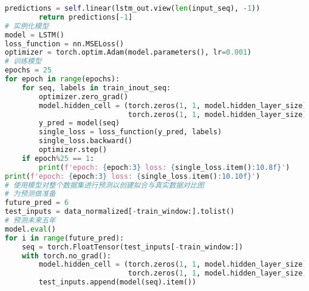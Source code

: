 \begin{lstlisting}[language=python,caption={就业前景}]
        predictions = self.linear(lstm_out.view(len(input_seq), -1))
        return predictions[-1]
# 实例化模型
model = LSTM()
loss_function = nn.MSELoss()
optimizer = torch.optim.Adam(model.parameters(), lr=0.001)
# 训练模型
epochs = 25
for epoch in range(epochs):
    for seq, labels in train_inout_seq:
        optimizer.zero_grad()
        model.hidden_cell = (torch.zeros(1, 1, model.hidden_layer_size),
                             torch.zeros(1, 1, model.hidden_layer_size))
        y_pred = model(seq)
        single_loss = loss_function(y_pred, labels)
        single_loss.backward()
        optimizer.step()
    if epoch%25 == 1:
        print(f'epoch: {epoch:3} loss: {single_loss.item():10.8f}')
print(f'epoch: {epoch:3} loss: {single_loss.item():10.10f}')
# 使用模型对整个数据集进行预测以创建拟合与真实数据对比图
# 为预测做准备
future_pred = 6
test_inputs = data_normalized[-train_window:].tolist()
# 预测未来五年
model.eval()
for i in range(future_pred):
    seq = torch.FloatTensor(test_inputs[-train_window:])
    with torch.no_grad():
        model.hidden_cell = (torch.zeros(1, 1, model.hidden_layer_size),
                             torch.zeros(1, 1, model.hidden_layer_size))
        test_inputs.append(model(seq).item())


\end{lstlisting}
